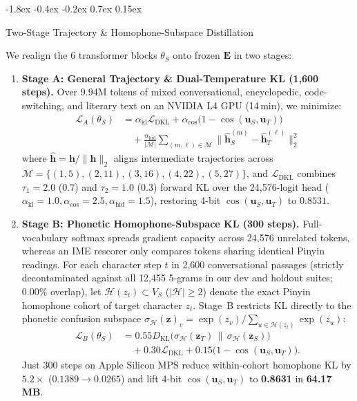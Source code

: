 \documentclass[10pt,twocolumn,letterpaper]{article}
\makeatletter
\renewcommand\subsection{\@startsection{subsection}{2}{\z@}%
  {-1.8ex \@plus -0.4ex \@minus -0.2ex}%
  {0.7ex \@plus 0.15ex}%
  {\normalfont\normalsize\fontsize{10.8}{13}\selectfont\bfseries\raggedright}}
\makeatother
\begin{document}
\subsection{Two-Stage Trajectory \& Homophone-Subspace Distillation}

We realign the 6 transformer blocks $\theta_S$ onto frozen $\bm{E}$ in two stages:
\begin{enumerate}
  \item \textbf{Stage A: General Trajectory \& Dual-Temperature KL (1,600 steps).} Over 9.94M tokens of mixed conversational, encyclopedic, code-switching, and literary text on an NVIDIA L4 GPU (14\,min), we minimize:
  \begin{equation}\label{eq:distill}
  \begin{aligned}
    \mathcal{L}_A(\theta_S) &= \alpha_{\text{kl}} \mathcal{L}_{\text{DKL}} + \alpha_{\text{cos}} \big(1 - \cos(\bm{u}_S, \bm{u}_T)\big) \\
    &\quad + \frac{\alpha_{\text{hid}}}{|\mathcal{M}|} \sum_{(m, \ell) \in \mathcal{M}} \big\| \hat{\bm{h}}_S^{(m)} - \hat{\bm{h}}_T^{(\ell)} \big\|_2^2
  \end{aligned}
  \end{equation}
  where $\hat{\bm{h}} = \bm{h} / \|\bm{h}\|_2$ aligns intermediate trajectories across $\mathcal{M} = \{(1,5), (2,11), (3,16), (4,22), (5,27)\}$, and $\mathcal{L}_{\text{DKL}}$ combines $\tau_1 = 2.0$ ($0.7$) and $\tau_2 = 1.0$ ($0.3$) forward KL over the 24,576-logit head ($\alpha_{\text{kl}} = 1.0, \alpha_{\text{cos}} = 2.5, \alpha_{\text{hid}} = 1.5$), restoring 4-bit $\cos(\bm{u}_S, \bm{u}_T)$ to $0.8531$.
  \item \textbf{Stage B: Phonetic Homophone-Subspace KL (300 steps).} Full-vocabulary softmax spreads gradient capacity across 24,576 unrelated tokens, whereas an IME rescorer only compares tokens sharing identical Pinyin readings. For each character step $t$ in 2,600 conversational passages (strictly decontaminated against all 12,455 5-grams in our dev and holdout suites; 0.00\% overlap), let $\mathcal{H}(z_t) \subset V_S$ ($|\mathcal{H}| \ge 2$) denote the exact Pinyin homophone cohort of target character $z_t$. Stage~B restricts KL directly to the phonetic confusion subspace $\sigma_{\mathcal{H}}(\bm{z})_v = \exp(z_v) / \sum_{u \in \mathcal{H}(z_t)} \exp(z_u)$:
  \begin{equation}\label{eq:homo}
  \begin{aligned}
    \mathcal{L}_B(\theta_S) &= 0.55 D_{\text{KL}}\!\big(\sigma_{\mathcal{H}}(\bm{z}_T) \,\|\, \sigma_{\mathcal{H}}(\bm{z}_S)\big) \\
    &\quad + 0.30 \mathcal{L}_{\text{DKL}} + 0.15 \big(1 - \cos(\bm{u}_S, \bm{u}_T)\big).
  \end{aligned}
  \end{equation}
  Just 300 steps on Apple Silicon MPS reduce within-cohort homophone KL by \textbf{$5.2\times$} ($0.1389 \to 0.0265$) and lift 4-bit $\cos(\bm{u}_S, \bm{u}_T)$ to \textbf{0.8631} in \textbf{64.17\,MB}.
\end{enumerate}
\end{document}
